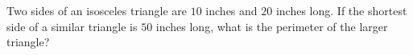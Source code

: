 Two sides of an isosceles triangle are $10$ inches and $20$ inches long. If the shortest side of a similar triangle is $50$ inches long, what is the perimeter of the larger triangle?
